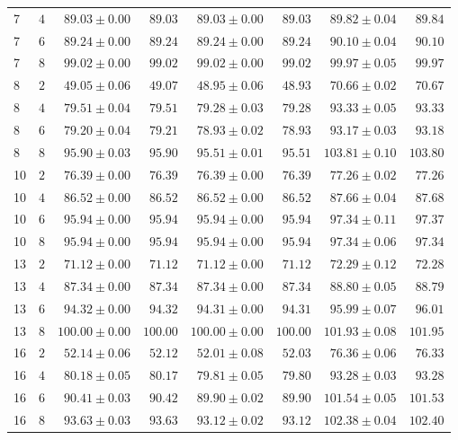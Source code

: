 \documentclass{article}
\theoremstyle{definition}
\theoremstyle{remark}
\begin{document}
\begin{table}[ht]
\begin{tabular}{llrrrrrr}
    7 & $4$ & $89.03 \pm 0.00$ & $89.03$ & $89.03 \pm 0.00$ & $89.03$ & $89.82 \pm 0.04$ & $89.84$ \\
    7 & $6$ & $89.24 \pm 0.00$ & $89.24$ & $89.24 \pm 0.00$ & $89.24$ & $90.10 \pm 0.04$ & $90.10$ \\
    7 & $8$ & $99.02 \pm 0.00$ & $99.02$ & $99.02 \pm 0.00$ & $99.02$ & $99.97 \pm 0.05$ & $99.97$ \\
    8 & $2$ & $49.05 \pm 0.06$ & $49.07$ & $48.95 \pm 0.06$ & $48.93$ & $70.66 \pm 0.02$ & $70.67$ \\
    8 & $4$ & $79.51 \pm 0.04$ & $79.51$ & $79.28 \pm 0.03$ & $79.28$ & $93.33 \pm 0.05$ & $93.33$ \\
    8 & $6$ & $79.20 \pm 0.04$ & $79.21$ & $78.93 \pm 0.02$ & $78.93$ & $93.17 \pm 0.03$ & $93.18$ \\
    8 & $8$ & $95.90 \pm 0.03$ & $95.90$ & $95.51 \pm 0.01$ & $95.51$ & $103.81 \pm 0.10$ & $103.80$ \\
    10 & $2$ & $76.39 \pm 0.00$ & $76.39$ & $76.39 \pm 0.00$ & $76.39$ & $77.26 \pm 0.02$ & $77.26$ \\
    10 & $4$ & $86.52 \pm 0.00$ & $86.52$ & $86.52 \pm 0.00$ & $86.52$ & $87.66 \pm 0.04$ & $87.68$ \\
    10 & $6$ & $95.94 \pm 0.00$ & $95.94$ & $95.94 \pm 0.00$ & $95.94$ & $97.34 \pm 0.11$ & $97.37$ \\
    10 & $8$ & $95.94 \pm 0.00$ & $95.94$ & $95.94 \pm 0.00$ & $95.94$ & $97.34 \pm 0.06$ & $97.34$ \\
    13 & $2$ & $71.12 \pm 0.00$ & $71.12$ & $71.12 \pm 0.00$ & $71.12$ & $72.29 \pm 0.12$ & $72.28$ \\
    13 & $4$ & $87.34 \pm 0.00$ & $87.34$ & $87.34 \pm 0.00$ & $87.34$ & $88.80 \pm 0.05$ & $88.79$ \\
    13 & $6$ & $94.32 \pm 0.00$ & $94.32$ & $94.31 \pm 0.00$ & $94.31$ & $95.99 \pm 0.07$ & $96.01$ \\
    13 & $8$ & $100.00 \pm 0.00$ & $100.00$ & $100.00 \pm 0.00$ & $100.00$ & $101.93 \pm 0.08$ & $101.95$ \\
    16 & $2$ & $52.14 \pm 0.06$ & $52.12$ & $52.01 \pm 0.08$ & $52.03$ & $76.36 \pm 0.06$ & $76.33$ \\
    16 & $4$ & $80.18 \pm 0.05$ & $80.17$ & $79.81 \pm 0.05$ & $79.80$ & $93.28 \pm 0.03$ & $93.28$ \\
    16 & $6$ & $90.41 \pm 0.03$ & $90.42$ & $89.90 \pm 0.02$ & $89.90$ & $101.54 \pm 0.05$ & $101.53$ \\
    16 & $8$ & $93.63 \pm 0.03$ & $93.63$ & $93.12 \pm 0.02$ & $93.12$ & $102.38 \pm 0.04$ & $102.40$ \\

\end{tabular}
\end{table}
\end{document}

